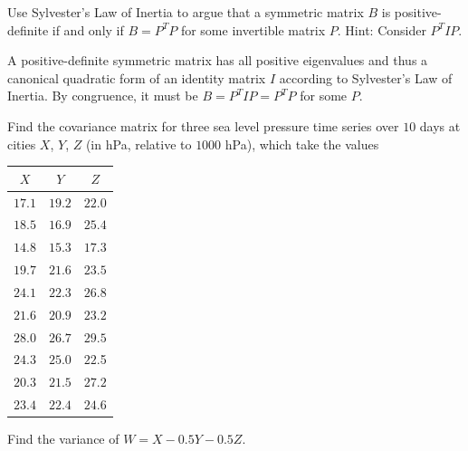 \begin{Exercise}
\label{ex:sylvesterdefinite}
Use Sylvester's Law of Inertia to argue that a symmetric matrix $B$ is positive-definite if and only if $B = P^TP$ for some invertible matrix $P$. Hint: Consider $P^T IP$.
\end{Exercise}
\begin{Answer}
A positive-definite symmetric matrix has all positive eigenvalues and thus a canonical quadratic form of an identity matrix $I$ according to Sylvester's Law of Inertia. By congruence, it must be $B = P^T IP = P^TP$ for some $P$.
\end{Answer}

\begin{Exercise}
Find the covariance matrix for three sea level pressure time series over $10$ days at cities $X$, $Y$, $Z$ (in hPa, relative to $1000$ hPa), which take the values
\begin{center}
\begin{tabular}{|c|c|c|}
\hline
$X$ & $Y$ & $Z$ \\
\hline
$17.1$ & $19.2$ & $22.0$ \\
\hline
$18.5$ & $16.9$ & $25.4$ \\
\hline
$14.8$ & $15.3$ & $17.3$ \\
\hline
$19.7$ & $21.6$ & $23.5$ \\
\hline
$24.1$ & $22.3$ & $26.8$ \\
\hline
$21.6$ & $20.9$ & $23.2$ \\
\hline 
$28.0$ & $26.7$ & $29.5$ \\
\hline
$24.3$ & $25.0$ & $22.$5 \\
\hline
$20.3$ & $21.5$ & $27.2$ \\
\hline
$23.4$ & $22.4$ & $24.6$ \\
\hline
\end{tabular}
\end{center}
Find the variance of $W = X - 0.5Y - 0.5Z$.
\end{Exercise}
